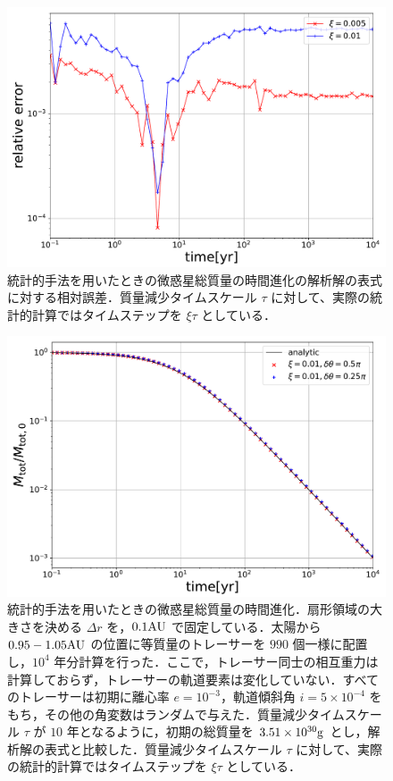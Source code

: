 \documentclass[11pt,a4paper,oneside,onecolumn]{jreport}
\begin{document}
\begin{figure}[H]
 \centering
 \includegraphics[width=12cm]{./image/MassDepletion_relative_error.pdf}
 \caption{統計的手法を用いたときの微惑星総質量の時間進化の解析解の表式\cite{3}に対する相対誤差．質量減少タイムスケール $\tau$ に対して、実際の統計的計算ではタイムステップを $\xi \tau$ としている．\label{}}
\end{figure}



\begin{figure}[H]
 \centering
 \includegraphics[width=12cm]{./image/MassDepletion_05pi025pi.pdf}
 \caption{統計的手法を用いたときの微惑星総質量の時間進化．扇形領域の大きさを決める $\Delta r$ を，$0.1 {\rm AU}$ で固定している．太陽から $0.95 - 1.05 {\rm AU}$ の位置に等質量のトレーサーを $990$ 個一様に配置し，$10^4$ 年分計算を行った．ここで，トレーサー同士の相互重力は計算しておらず，トレーサーの軌道要素は変化していない．すべてのトレーサーは初期に離心率 $e = 10^{-3}$，軌道傾斜角 $i = 5 \times 10^{-4}$ をもち，その他の角変数はランダムで与えた．質量減少タイムスケール $\tau$ が $10$ 年となるように，初期の総質量を $3.51 \times 10^{30} {\rm g}$ とし，解析解の表式\cite{3}と比較した．質量減少タイムスケール $\tau$ に対して、実際の統計的計算ではタイムステップを $\xi \tau$ としている．\label{}}
\end{figure}
\end{document}
